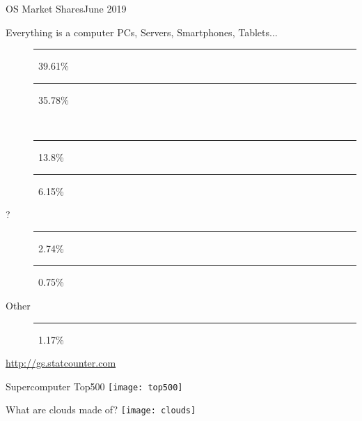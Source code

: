 \begin{frame}{OS Market Shares}{June 2019}
  \begin{block}{Everything is a computer}
    PCs, Servers, Smartphones, Tablets...
    \begin{description}
    \item[\android] \textcolor{Green}{\rule{.3961\textwidth}{2mm}}\,
      39.61\%
    \item[\win] \textcolor{SkyBlue}{\rule{.3578\textwidth}{2mm}}\, 35.78\%
    \item[] \textcolor{LightGray}{\rule{.138\textwidth}{2mm}}\, 13.8\%
    \item[\apple] \textcolor{LightGray}{\rule{.0615\textwidth}{2mm}}\, 6.15\%
    \item[?] \textcolor{gray}{\rule{.0274\textwidth}{2mm}}\, 2.74\%
    \item[\linux] \rule{.0075\textwidth}{2mm}\, 0.75\%
    \item[Other] \textcolor{gray}{\rule{.0117\textwidth}{2mm}}\, 1.17\%
    \end{description}
  \end{block}
  \begin{flushright}
    \scriptsize \url{http://gs.statcounter.com}
  \end{flushright}
\end{frame}

\begin{frame}{Supercomputer Top500}
  \centering\texttt{[image: top500]}
\end{frame}

\begin{frame}{What are clouds made of?}
  \centering\texttt{[image: clouds]}
\end{frame}

